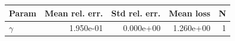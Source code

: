 \begin{tabular}{lrrrr}
\hline
Param & Mean rel. err. & Std rel. err. & Mean loss & N \\
\hline
$\gamma$ & 1.950e-01 & 0.000e+00 & 1.260e+00 & 1 \\
\hline
\end{tabular}
